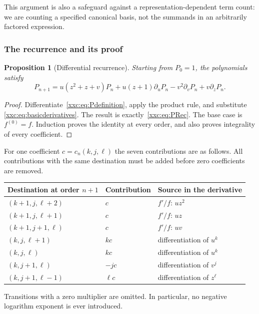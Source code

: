 \documentclass[11pt,a4paper]{article}
\numberwithin{equation}{section}
\newtheorem{proposition}[theorem]{Proposition}
\theoremstyle{definition}
\theoremstyle{remark}
\theoremstyle{plain}
\begin{document}
This argument is also a safeguard against a representation-dependent term
count: we are counting a specified canonical basis, not the summands in an
arbitrarily factored expression.

\subsubsection{The recurrence and its proof}

\begin{proposition}[Differential recurrence]\label{xxc:prop:recurrence}
Starting from $P_0=1$, the polynomials satisfy
\begin{equation}\label{xxc:eq:PRec}
 P_{n+1}=u(z^2+z+v)P_n+u(z+1)\partial_uP_n
          -v^2\partial_vP_n+v\partial_zP_n.
\end{equation}
\end{proposition}
\begin{proof}
Differentiate~\eqref{xxc:eq:Pdefinition}, apply the product rule, and substitute
\eqref{xxc:eq:basicderivatives}. The result is exactly~\eqref{xxc:eq:PRec}.
The base case is $f^{(0)}=f$. Induction proves the identity at every order,
and also proves integrality of every coefficient.
\end{proof}

For one coefficient $c=c_n(k,j,\ell)$ the seven contributions are as follows.
All contributions with the same destination must be added before zero
coefficients are removed.
\begin{center}
\begin{tabular}{lll}
\toprule
Destination at order $n+1$ & Contribution & Source in the derivative\\
\midrule
$(k+1,j,\ell+2)$ & $c$ & $f'/f$: $uz^2$\\
$(k+1,j,\ell+1)$ & $c$ & $f'/f$: $uz$\\
$(k+1,j+1,\ell)$ & $c$ & $f'/f$: $uv$\\
$(k,j,\ell+1)$ & $kc$ & differentiation of $u^k$\\
$(k,j,\ell)$ & $kc$ & differentiation of $u^k$\\
$(k,j+1,\ell)$ & $-jc$ & differentiation of $v^j$\\
$(k,j+1,\ell-1)$ & $\ell c$ & differentiation of $z^\ell$\\
\bottomrule
\end{tabular}
\end{center}
Transitions with a zero multiplier are omitted. In particular, no negative
logarithm exponent is ever introduced.
\end{document}
